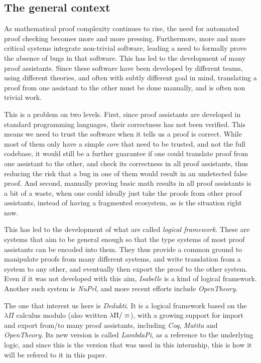 
\thispagestyle{empty}
\subsection*{The general context}

As mathematical proof complexity continues to rise, the need for automated proof
checking becomes more and more pressing. Furthermore, more and more critical
systems integrate non-trivial software, leading a need to formally prove the
absence of bugs in that software. This has led to the development of many proof
assistants. Since these software have been developed by different teams, using
different theories, and often with subtly different goal in mind, translating a
proof from one assistant to the other must be done manually, and is often non
trivial work.

This is a problem on two levels. First, since proof assistants are developed in
standard programming languages, their correctness has not been verified. This
means we need to trust the software when it tells us a proof is correct. While
most of them only have a simple \emph{core} that need to be trusted, and not the
full codebase, it would still be a further guarantee if one could translate
proof from one assistant to the other, and check its correctness in all proof
assistants, thus reducing the risk that a bug in one of them would result in an
undetected false proof. And second, manually proving basic math results in all
proof assistants is a bit of a waste, when one could ideally just take the
proofs from other proof assistants, instead of having a fragmented ecosystem, as
is the situation right now.

This has led to the development of what are called \emph{logical framework}.
These are systems that aim to be general enough so that the type systems of most
proof assistants can be encoded into them. They thus provide a common ground to
manipulate proofs from many different systems, and write translation from a
system to any other, and eventually then export the proof to the other system.
Even if it was not developed with this aim,
\emph{Isabelle}\cite{nipkow_isabellehol_2002} is a kind of logical framework.
Another such system is \emph{NuPrl}\cite{allen_nuprl_2000}, and more recent
efforts include \emph{OpenTheory}\cite{hurd_opentheory_2009}.

The one that interest us here is \emph{Dedukti}\cite{assaf_dedukti_2016}. It is
a logical framework based on the $\lambda\Pi$ calculus modulo (also written
$\lambda\Pi/\equiv$), with a growing support for import and export from/to many proof
assistants, including \emph{Coq}, \emph{Matita} and \emph{OpenTheory}. Its new
version is called \emph{LambdaPi}, as a reference to the underlying logic, and
since this is the version that was used in this internship, this is how it will
be refered to it in this paper.

